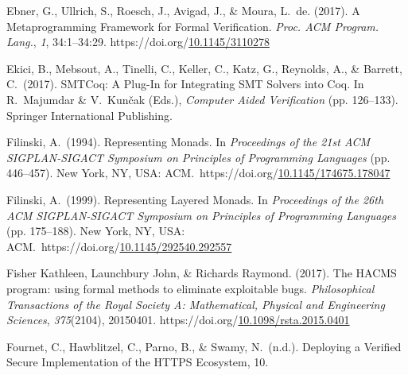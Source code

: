 \documentclass[12pt,twoside]{article}
\begin{document}
{\begin{thebibliography}{222}
\mdbibitemlabel{}Ebner, G., Ullrich, S., Roesch, J., Avigad, J., \& Moura, L.~de. (2017). A Metaprogramming Framework for Formal Verification. \emph{Proc. ACM Program. Lang.}, \emph{1}, 34:1–34:29. https://doi.org/\href{https://dx.doi.org/10.1145/3110278}{10.1145/3110278}\label{ebner_metaprogramming_2017}%

\mdbibitemlabel{}Ekici, B., Mebsout, A., Tinelli, C., Keller, C., Katz, G., Reynolds, A., \& Barrett, C.~(2017). SMTCoq: A Plug-In for Integrating SMT Solvers into Coq. In R.~Majumdar \& V.~Kunčak (Eds.), \emph{Computer Aided Verification} (pp. 126–133). Springer International Publishing.\label{ekici_smtcoq:_2017}%

\mdbibitemlabel{}Filinski, A.~(1994). Representing Monads. In \emph{Proceedings of the 21st ACM SIGPLAN-SIGACT Symposium on Principles of Programming Languages} (pp. 446–457). New York, NY, USA: ACM.~https://doi.org/\href{https://dx.doi.org/10.1145/174675.178047}{10.1145/174675.178047}\label{filinski_representing_1994}%

\mdbibitemlabel{}Filinski, A.~(1999). Representing Layered Monads. In \emph{Proceedings of the 26th ACM SIGPLAN-SIGACT Symposium on Principles of Programming Languages} (pp. 175–188). New York, NY, USA: ACM.~https://doi.org/\href{https://dx.doi.org/10.1145/292540.292557}{10.1145/292540.292557}\label{filinski_representing_1999}%

\mdbibitemlabel{}Fisher Kathleen, Launchbury John, \& Richards Raymond. (2017). The HACMS program: using formal methods to eliminate exploitable bugs. \emph{Philosophical Transactions of the Royal Society A: Mathematical, Physical and Engineering Sciences}, \emph{375}(2104), 20150401. https://doi.org/\href{https://dx.doi.org/10.1098/rsta.2015.0401}{10.1098/rsta.2015.0401}\label{fisher_kathleen_hacms_2017}%

\mdbibitemlabel{}Fournet, C., Hawblitzel, C., Parno, B., \& Swamy, N.~(n.d.). Deploying a Veriﬁed Secure Implementation of the HTTPS Ecosystem, 10.\label{fournet_deploying_nodate}%


\end{thebibliography}}
\end{document}
